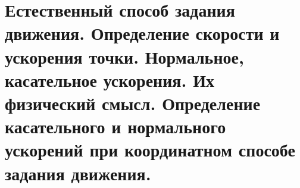 \chapter{Естественный способ задания движения. Определение скорости и ускорения
точки. Нормальное, касательное ускорения. Их физический смысл. Определение
касательного и нормального ускорений при координатном способе задания движения.}



\newpage
